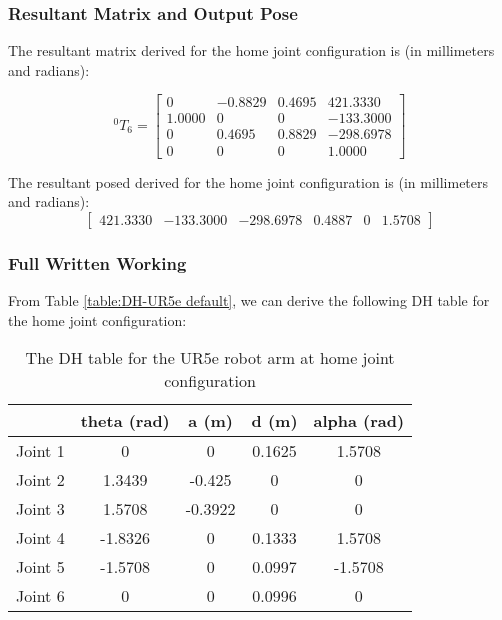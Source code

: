 \documentclass[12pt]{article}
\begin{document}
\subsubsection{Resultant Matrix and Output Pose}

The resultant matrix derived for the home joint configuration is (in millimeters and radians):

\begin{equation*}
    ^{0}T_{6} = \begin{bmatrix}
        0      & -0.8829 & 0.4695 & 421.3330  \\
        1.0000 & 0       & 0      & -133.3000 \\
        0      & 0.4695  & 0.8829 & -298.6978 \\
        0      & 0       & 0      & 1.0000
    \end{bmatrix}
\end{equation*}

The resultant posed derived for the home joint configuration is (in millimeters and radians):
\begin{equation*}
    \begin{bmatrix}
        421.3330 & -133.3000 & -298.6978 & 0.4887 & 0 & 1.5708
    \end{bmatrix}
\end{equation*}
\subsubsection{Full Written Working}

From Table \ref{table:DH-UR5e default}, we can derive the following DH table for the home joint configuration:

\begin{table}[H]
    \centering
    \begin{tabular}{|c|c|c|c|c|}
        \hline
                & \textbf{theta (rad)} & \textbf{a (m)} & \textbf{d (m)} & \textbf{alpha (rad)} \\ \hline
        Joint 1 & 0                    & 0              & 0.1625         & 1.5708               \\ \hline
        Joint 2 & 1.3439               & -0.425         & 0              & 0                    \\ \hline
        Joint 3 & 1.5708               & -0.3922        & 0              & 0                    \\ \hline
        Joint 4 & -1.8326              & 0              & 0.1333         & 1.5708               \\ \hline
        Joint 5 & -1.5708              & 0              & 0.0997         & -1.5708              \\ \hline
        Joint 6 & 0                    & 0              & 0.0996         & 0                    \\ \hline
    \end{tabular}
    \caption{The DH table for the UR5e robot arm at home joint configuration}
    \label{table:DH-UR5e home}
\end{table}
\end{document}
